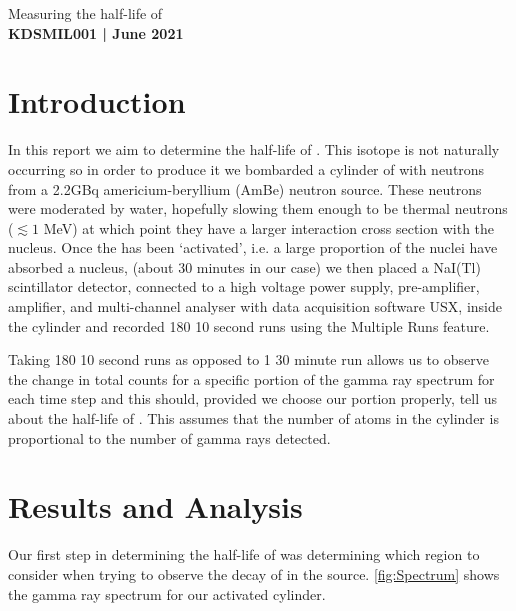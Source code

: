 \documentclass[11pt]{article}
\numberwithin{equation}{section}
\numberwithin{figure}{section}
\numberwithin{table}{section}
\begin{document}
\begin{center}
    {\huge Measuring the half-life of }\\
    \vspace{0.2in}
    \textbf{KDSMIL001 | June 2021}
\end{center}

\section{Introduction}\label{sec:Introduction}
\par In this report we aim to determine the half-life of . This isotope is not naturally occurring so in order to produce it we bombarded a cylinder of  with neutrons from a 2.2GBq americium-beryllium (AmBe) neutron source. These neutrons were moderated by water, hopefully slowing them enough to be thermal neutrons ($\lesssim 1$ MeV) at which point they have a larger interaction cross section with the  nucleus. Once the  has been `activated', i.e. a large proportion of the nuclei have absorbed a nucleus, (about 30 minutes in our case) we then placed a NaI(Tl) scintillator detector, connected to a high voltage power supply, pre-amplifier, amplifier, and multi-channel analyser with data acquisition software USX, inside the cylinder and recorded 180 10 second runs using the Multiple Runs feature. 
\par Taking 180 10 second runs as opposed to 1 30 minute run allows us to observe the change in total counts for a specific portion of the gamma ray spectrum for each time step and this should, provided we choose our portion properly, tell us about the half-life of . This assumes that the number of  atoms in the cylinder is proportional to the number of gamma rays detected.

\section{Results and Analysis}\label{sec:Results}
\par Our first step in determining the half-life of  was determining which region to consider when trying to observe the decay of  in the source. \autoref{fig:Spectrum} shows the gamma ray spectrum for our activated  cylinder.
\end{document}
